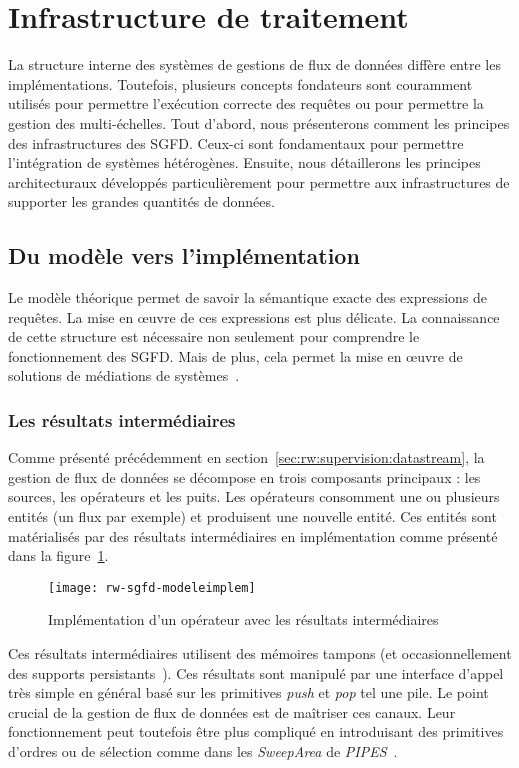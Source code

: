 \section{Infrastructure de traitement}\label{sec:rw:sgfd:infra}
La structure interne des systèmes de gestions de flux de données diffère entre les implémentations. Toutefois, plusieurs concepts fondateurs sont couramment utilisés pour permettre l'exécution correcte des requêtes ou pour permettre la gestion des multi-échelles. Tout d'abord, nous présenterons comment les principes des infrastructures des SGFD. Ceux-ci sont fondamentaux pour permettre l'intégration de systèmes hétérogènes. Ensuite, nous détaillerons les principes architecturaux développés particulièrement pour permettre aux infrastructures de supporter les grandes quantités de données.

\subsection{Du modèle vers l'implémentation}
Le modèle théorique permet de savoir la sémantique exacte des expressions de requêtes. La mise en œuvre de ces expressions est plus délicate. La connaissance de cette structure est nécessaire non seulement pour comprendre le fonctionnement des SGFD. Mais de plus, cela permet la mise en œuvre de solutions de médiations de systèmes~\cite{Tatbul:integration}.

\subsubsection{Les résultats intermédiaires}
Comme présenté précédemment en section~\ref{sec:rw:supervision:datastream}, la gestion de flux de données se décompose en trois composants principaux : les sources, les opérateurs et les puits. Les opérateurs consomment une ou plusieurs entités (un flux par exemple) et produisent une nouvelle entité. Ces entités sont matérialisés par des résultats intermédiaires en implémentation comme présenté dans la figure~\ref{fig:rw:sgfd:modeleimplem}.
\begin{figure}[ht]
    \centering
    \texttt{[image: rw-sgfd-modeleimplem]}
    \caption{Implémentation d'un opérateur avec les résultats intermédiaires}\label{fig:rw:sgfd:modeleimplem}
\end{figure}

Ces résultats intermédiaires utilisent des mémoires tampons (et occasionnellement des supports persistants~\cite{Abadi:aurora}). Ces résultats sont manipulé par une interface d'appel très simple en général basé sur les primitives \textit{push} et \textit{pop} tel une pile. Le point crucial de la gestion de flux de données est de maîtriser ces canaux. Leur fonctionnement peut toutefois être plus compliqué en introduisant des primitives d'ordres ou de sélection comme dans les \textit{SweepArea} de \textit{PIPES}~\cite{Kramer:semantics}.

